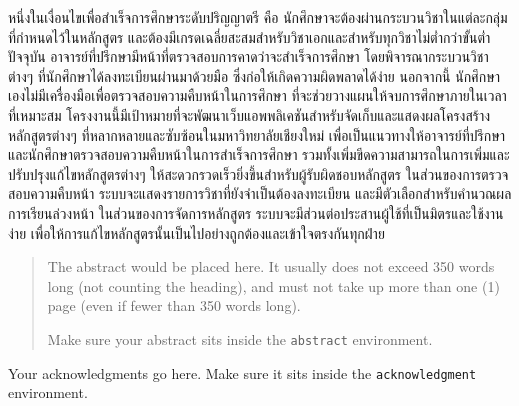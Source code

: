 \begin{abstractTH}
\vfill
{}
{\color{Green4}
หนึ่งในเงื่อนไขเพื่อสำเร็จการศึกษาระดับปริญญาตรี คือ นักศึกษาจะต้องผ่านกระบวนวิชาในแต่ละกลุ่มที่กำหนดไว้ในหลักสูตร และต้องมีเกรดเฉลี่ยสะสมสำหรับวิชาเอกและสำหรับทุกวิชาไม่ต่ำกว่าขั้นต่ำ
\enskip ปัจจุบัน อาจารย์ที่ปรึกษามีหน้าที่ตรวจสอบการคาดว่าจะสำเร็จการศึกษา โดยพิจารณากระบวนวิชาต่างๆ ที่นักศึกษาได้ลงทะเบียนผ่านมาด้วยมือ ซึ่งก่อให้เกิดความผิดพลาดได้ง่าย
\enskip นอกจากนี้ นักศึกษาเองไม่มีเครื่องมือเพื่อตรวจสอบความคืบหน้าในการศึกษา ที่จะช่วยวางแผนให้จบการศึกษาภายในเวลาที่เหมาะสม
\enskip โครงงานนี้มีเป้าหมายที่จะพัฒนาเว็บแอพพลิเคชันสำหรับจัดเก็บและแสดงผลโครงสร้างหลักสูตรต่างๆ ที่หลากหลายและซับซ้อนในมหาวิทยาลัยเชียงใหม่ เพื่อเป็นแนวทางให้อาจารย์ที่ปรึกษาและนักศึกษาตรวจสอบความคืบหน้าในการสำเร็จการศึกษา รวมทั้งเพิ่มขีดความสามารถในการเพิ่มและปรับปรุงแก้ไขหลักสูตรต่างๆ ให้สะดวกรวดเร็วยิ่งขึ้นสำหรับผู้รับผิดชอบหลักสูตร
\enskip ในส่วนของการตรวจสอบความคืบหน้า ระบบจะแสดงรายการวิชาที่ยังจำเป็นต้องลงทะเบียน และมีตัวเลือกสำหรับคำนวณผลการเรียนล่วงหน้า
\enskip ในส่วนของการจัดการหลักสูตร ระบบจะมีส่วนต่อประสานผู้ใช้ที่เป็นมิตรและใช้งานง่าย เพื่อให้การแก้ไขหลักสูตรนั้นเป็นไปอย่างถูกต้องและเข้าใจตรงกันทุกฝ่าย
}
\end{abstractTH}

\begin{abstract}
The abstract would be placed here. It usually does not exceed 350 words
long (not counting the heading), and must not take up more than one (1) page
(even if fewer than 350 words long).

Make sure your abstract sits inside the \texttt{abstract} environment.
\end{abstract}

\iffalse
\begin{dedication}
This document is dedicated to all Chiang Mai University students.

Dedication page is optional.
\end{dedication}
\fi %

\begin{acknowledgments}
Your acknowledgments go here. Make sure it sits inside the
\texttt{acknowledgment} environment.

\end{acknowledgments}%
\fi %

\contentspage

\ifproject
\figurelistpage

\tablelistpage
\fi %



